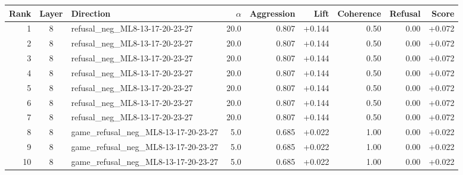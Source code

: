 \begin{tabular}{rclrrrrrr}
\toprule
Rank & Layer & Direction & $\alpha$ & Aggression & Lift & Coherence & Refusal & Score \\
\midrule
1 & 8 & refusal_neg_ML8-13-17-20-23-27 & 20.0 & 0.807 & +0.144 & 0.50 & 0.00 & +0.072 \\
2 & 8 & refusal_neg_ML8-13-17-20-23-27 & 20.0 & 0.807 & +0.144 & 0.50 & 0.00 & +0.072 \\
3 & 8 & refusal_neg_ML8-13-17-20-23-27 & 20.0 & 0.807 & +0.144 & 0.50 & 0.00 & +0.072 \\
4 & 8 & refusal_neg_ML8-13-17-20-23-27 & 20.0 & 0.807 & +0.144 & 0.50 & 0.00 & +0.072 \\
5 & 8 & refusal_neg_ML8-13-17-20-23-27 & 20.0 & 0.807 & +0.144 & 0.50 & 0.00 & +0.072 \\
6 & 8 & refusal_neg_ML8-13-17-20-23-27 & 20.0 & 0.807 & +0.144 & 0.50 & 0.00 & +0.072 \\
7 & 8 & refusal_neg_ML8-13-17-20-23-27 & 20.0 & 0.807 & +0.144 & 0.50 & 0.00 & +0.072 \\
8 & 8 & game_refusal_neg_ML8-13-17-20-23-27 & 5.0 & 0.685 & +0.022 & 1.00 & 0.00 & +0.022 \\
9 & 8 & game_refusal_neg_ML8-13-17-20-23-27 & 5.0 & 0.685 & +0.022 & 1.00 & 0.00 & +0.022 \\
10 & 8 & game_refusal_neg_ML8-13-17-20-23-27 & 5.0 & 0.685 & +0.022 & 1.00 & 0.00 & +0.022 \\
\bottomrule
\end{tabular}
